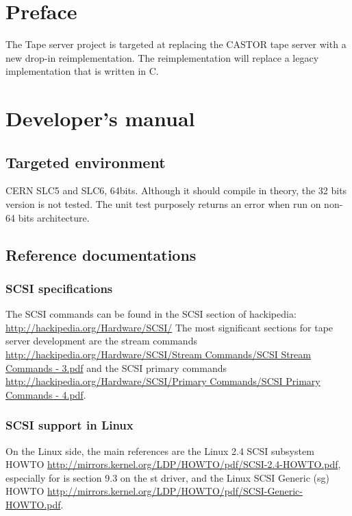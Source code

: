 \chapter*{Preface}

The Tape server project is targeted at replacing the CASTOR tape server with a new drop-{}in reimplementation. The reimplementation will replace a legacy implementation that is written in C.


\chapter{Developer's manual}

\section{Targeted environment}

CERN SLC5 and SLC6, 64bits. Although it should compile in theory, the 32 bits version is not tested. The unit test purposely returns an error when run on non-64 bits architecture.

\section{Reference documentations}
\subsection{SCSI specifications}

The SCSI commands can be found in the SCSI section of hackipedia:
 \href{http://hackipedia.org/Hardware/SCSI/}{http://hackipedia.org/Hardware/SCSI/}   The most significant sections for tape server development are the stream commands
 \href{http://hackipedia.org/Hardware/SCSI/Stream%20Commands/SCSI%20Stream%20Commands%20-%203.pdf}
    {http://hackipedia.org/Hardware/SCSI/Stream Commands/SCSI Stream Commands - 3.pdf} 
 and the SCSI primary commands
    \href{http://hackipedia.org/Hardware/SCSI/Primary%20Commands/SCSI%20Primary%20Commands%20-%204.pdf}
      {http://hackipedia.org/Hardware/SCSI/Primary Commands/SCSI Primary Commands - 4.pdf}.

\subsection{SCSI support in Linux}
On the Linux side, the main references are the Linux 2.4 SCSI subsystem HOWTO
\href{http://mirrors.kernel.org/LDP/HOWTO/pdf/SCSI-2.4-HOWTO.pdf}{http://mirrors.kernel.org/LDP/HOWTO/pdf/SCSI-2.4-HOWTO.pdf},
especially for is section 9.3 on the st driver,
and the Linux SCSI Generic (sg) HOWTO 
 \href{http://mirrors.kernel.org/LDP/HOWTO/pdf/SCSI-Generic-HOWTO.pdf}{http://mirrors.kernel.org/LDP/HOWTO/pdf/SCSI-Generic-HOWTO.pdf}.

